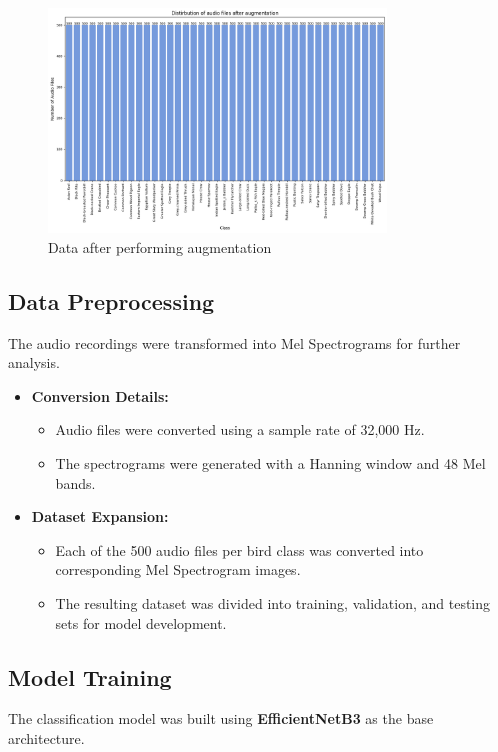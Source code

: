 \begin{figure}[h!]
    \centering
    \includegraphics[width=0.8\textwidth]{images/after_augmentation.png}
    \caption{Data after performing augmentation}
    \label{fig:visualization}
\end{figure}

\newpage

\subsection{Data Preprocessing}
The audio recordings were transformed into Mel Spectrograms for further
analysis.

\begin{itemize}
    \item \textbf{Conversion Details:}
          \begin{itemize}
              \item Audio files were converted using a sample rate of 32,000 Hz.
              \item The spectrograms were generated with a Hanning window and 48 Mel bands.
          \end{itemize}

    \item \textbf{Dataset Expansion:}
          \begin{itemize}
              \item Each of the 500 audio files per bird class was converted into corresponding Mel
                    Spectrogram images.
              \item The resulting dataset was divided into training, validation, and testing sets
                    for model development.
          \end{itemize}
\end{itemize}

\subsection{Model Training}
The classification model was built using \textbf{EfficientNetB3} as the base
architecture.

